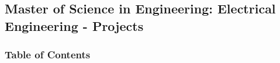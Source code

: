 \subsection{Master of Science in Engineering: Electrical Engineering - Projects}

\subsubsection{Table of Contents}